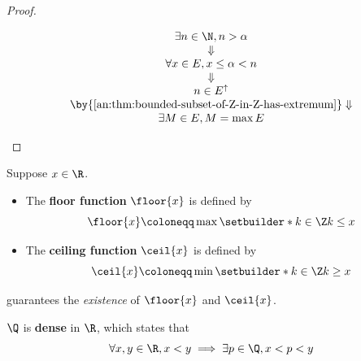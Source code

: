 \begin{proof}
\begin{enumerate}[label=\textbf{(\Alph*)}]
\[\begin{array}{c}
              \exists n \in \N, n > \alpha                                        \\
              \Downarrow                                                          \\
              \forall x \in E, x \leq \alpha < n                                  \\
              \Downarrow                                                          \\
              n \in E^{\uparrow}                                                  \\
              \by{\Cref{an:thm:bounded-subset-of-Z-in-Z-has-extremum}} \Downarrow \\
              \exists M \in E, M = \max E
            \end{array}
          \]
  \end{enumerate}
\end{proof}

\bigskip

\begin{definition} \label{an:def:floor-ceiling-functions}
  Suppose $x \in \R$.
  \begin{itemize}
    \item The \textbf{floor function} $\floor{x}$ is defined by
          \[
            \floor{x} \coloneqq \max\setbuilder*{k \in \Z}{k \leq x}
          \]
    \item The \textbf{ceiling function} $\ceil{x}$ is defined by
          \[
            \ceil{x} \coloneqq \min\setbuilder*{k \in \Z}{k \geq x}
          \]
  \end{itemize}
   guarantees the \emph{existence} of $\floor{x}$ and $\ceil{x}$.
\end{definition}

\bigskip

\begin{theorem} \label{an:thm:Q-is-dense-in-R}
  $\Q$ is \textbf{dense} in $\R$, which states that
  \[
    \forall x,y \in \R, x < y \implies \exists p \in \Q, x < p < y
  \]
\end{theorem}


